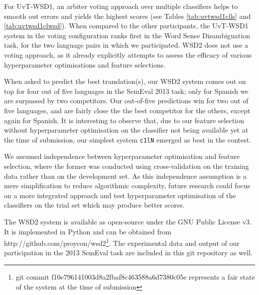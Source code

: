 For UvT-WSD1, an arbiter voting approach over multiple classifiers helps to smooth out errors
and yields the highest scores (see Tables \ref{tab:uvtwsd1clls} and
\ref{tab:uvtwsd1clwsd}). When compared to the other
participants, the UvT-WSD1 system in the voting configuration ranks first in
the Word Sense Disambiguation task, for the two language pairs in which we
participated. WSD2 does not use a voting approach, as it already explicitly
attempts to assess the efficacy of various hyperparameter optimisations and
feature selections.

When asked to predict the best translation(s), our WSD2 system comes out on top
for four out of five languages in the SemEval 2013 task; only for Spanish we
are surpassed by two competitors. Our out-of-five predictions win for two out
of five languages, and are fairly close the the best competitor for the others,
except again for Spanish. It is interesting to observe that, due to our feature
selection without hyperparameter optimisation on the classifier not being
available yet at the time of submission, our simplest system \texttt{c1lN}
emerged as best in the contest.

We assumed independence between hyperparameter optimisation and feature
selection, where the former was conducted using cross-validation on the
training data rather than on the development set. As this independence
assumption is a mere simplification to reduce algorithmic complexity, future
research could focus on a more integrated approach and test hyperparameter
optimisation of the classifiers on the trial set which may produce better
scores.

The WSD2 system is available as open-source under the GNU Public License v3. It
is implemented in Python \citep{PYTHON} and can be obtained from
http://github.com/proycon/wsd2\footnote{git commit
f10e796141003d8a2fbaf8c463588a6d7380c05e represents a fair state of the system
at the time of submission}. The experimental data and output of our
participation in the 2013 SemEval task are included in
this git repository as well.

